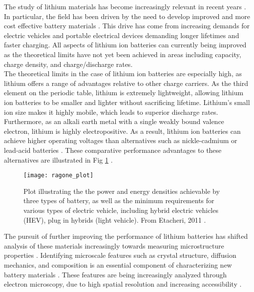 



 

The study of lithium materials has become increasingly relevant in recent years \cite{nitta_li-ion_2015}.  In particular, the field has been driven by the need to develop improved  and more cost effective battery materials \cite{nitta_li-ion_2015}.  This drive has come from increasing demands for electric vehicles and portable electrical devices demanding longer lifetimes and faster charging.  All aspects of lithium ion batteries can currently being improved as the theoretical limits have not yet been achieved in areas including capacity, charge density, and charge/discharge rates. \\


The theoretical limits in the case of lithium ion batteries are especially high, as lithium offers a range of advantages relative to other charge carriers. As the third element on the periodic table, lithium is extremely lightweight, allowing lithium ion batteries to be smaller and lighter without sacrificing lifetime.  Lithium's small ion size makes it highly mobile, which leads to superior discharge rates.   Furthermore, as an alkali earth metal with a single weakly bound valence electron, lithium is highly electropositive.   As a result, lithium ion batteries can achieve higher operating voltages than alternatives such as nickle-cadmium or lead-acid batteries \cite{etacheri_challenges_2011}.  These comparative performance advantages to these alternatives are illustrated in Fig \ref{ragone} \cite{etacheri_challenges_2011}.\\

\begin{figure}
	\centering
	\texttt{[image: ragone\_plot]}
	\caption{Plot illustrating the the power and energy densities achievable by three types of battery, as well as the minimum requirements for various types of electric vehicle, including hybrid electric vehicles (HEV), plug in hybrids (light vehicle). From Etacheri, 2011 \cite{etacheri_challenges_2011}. }
	\label{ragone}
	
\end{figure}
The pursuit of further improving the performance of lithium batteries has shifted analysis of these materials increasingly towards measuring microstructure properties \cite{lu_lithium_2012,arthur_spontaneous_2016, muller_quantification_2018}. Identifying microscale features such as crystal structure, diffusion mechanics, and composition is an essential component of characterizing new battery materials \cite{van_der_ven_first-principles_2001}. These features are being increasingly analyzed through electron microscopy, due to high spatial resolution and increasing accessibility   \cite{chiu_aqueous_2013,inkson_2_2016, hansen_atomic-resolution_2001}. \\

